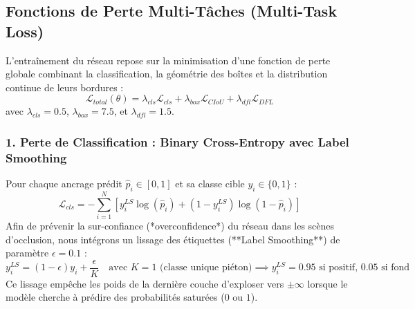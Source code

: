 \documentclass[11pt,a4paper]{article}
\begin{document}
\subsection{Fonctions de Perte Multi-Tâches (Multi-Task Loss)}
L'entraînement du réseau repose sur la minimisation d'une fonction de perte globale combinant la classification, la géométrie des boîtes et la distribution continue de leurs bordures :
\begin{equation}
    \mathcal{L}_{total}(\theta) = \lambda_{cls} \mathcal{L}_{cls} + \lambda_{box} \mathcal{L}_{CIoU} + \lambda_{dfl} \mathcal{L}_{DFL}
\end{equation}
avec $\lambda_{cls} = 0.5$, $\lambda_{box} = 7.5$, et $\lambda_{dfl} = 1.5$.

\subsubsection{1. Perte de Classification : Binary Cross-Entropy avec Label Smoothing}
Pour chaque ancrage prédit $\hat{p}_i \in [0, 1]$ et sa classe cible $y_i \in \{0, 1\}$ :
\begin{equation}
    \mathcal{L}_{cls} = - \sum_{i=1}^{N} \left[ y_i^{LS} \log(\hat{p}_i) + (1 - y_i^{LS}) \log(1 - \hat{p}_i) \right]
\end{equation}
Afin de prévenir la sur-confiance (*overconfidence*) du réseau dans les scènes d'occlusion, nous intégrons un lissage des étiquettes (**Label Smoothing**) de paramètre $\epsilon = 0.1$ :
\begin{equation}
    y_i^{LS} = (1 - \epsilon) y_i + \frac{\epsilon}{K} \quad \text{avec } K = 1 \text{ (classe unique piéton)} \implies y_i^{LS} = 0.95 \text{ si positif, } 0.05 \text{ si fond}
\end{equation}
Ce lissage empêche les poids de la dernière couche d'exploser vers $\pm \infty$ lorsque le modèle cherche à prédire des probabilités saturées ($0$ ou $1$).
\end{document}
